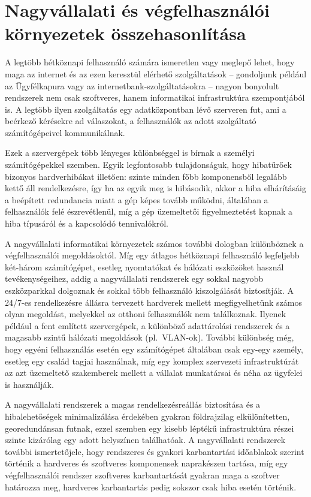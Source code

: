 \section{Nagyvállalati és végfelhasználói környezetek összehasonlítása}
A legtöbb hétköznapi felhasználó számára ismeretlen vagy meglepő lehet, hogy maga az internet és az ezen keresztül elérhető szolgáltatások -- gondoljunk például az Ügyfélkapura vagy az internetbank-szolgáltatásokra -- nagyon bonyolult rendszerek nem csak szoftveres, hanem informatikai infrastruktúra szempontjából is. A legtöbb ilyen szolgáltatás egy adatközpontban lévő szerveren fut, ami a beérkező kérésekre ad válaszokat, a felhasználók az adott szolgáltató számítógépeivel kommunikálnak.

Ezek a szervergépek több lényeges különbséggel is bírnak a személyi számítógépekkel szemben. Egyik legfontosabb tulajdonságuk, hogy hibatűrőek bizonyos hardverhibákat illetően: szinte minden főbb komponensből legalább kettő áll rendelkezésre, így ha az egyik meg is hibásodik, akkor a hiba elhárításáig a beépített redundancia miatt a gép képes tovább működni, általában a felhasználók felé észrevétlenül, míg a gép üzemeltetői figyelmeztetést kapnak a hiba típusáról és a kapcsolódó tennivalókról.

A nagyvállalati informatikai környezetek számos további dologban különböznek a végfelhasználói megoldásoktól. Míg egy átlagos hétköznapi felhasználó legfeljebb két-három számítógépet, esetleg nyomtatókat és hálózati eszközöket használ tevékenységeihez, addig a nagyvállalati rendszerek egy sokkal nagyobb eszközparkkal dolgoznak és sokkal több felhasználó kiszolgálását biztosítják. A 24/7-es rendelkezésre állásra tervezett hardverek mellett megfigyelhetünk számos olyan megoldást, melyekkel az otthoni felhasználók nem találkoznak. Ilyenek például a fent említett szervergépek, a különböző adattárolási rendszerek és a magasabb szintű hálózati megoldások (pl.~VLAN-ok). További különbség még, hogy egyéni felhasználás esetén egy számítógépet általában csak egy-egy személy, esetleg egy család tagjai használnak, míg egy komplex szervezeti infrastruktúrát az azt üzemeltető szakemberek mellett a vállalat munkatársai és néha az ügyfelei is használják.

A nagyvállalati rendszerek a magas rendelkezésreállás biztosítása és a hibalehetőségek minimalizálása érdekében gyakran földrajzilag elkülönítetten, georedundánsan futnak, ezzel szemben egy kisebb léptékű infrastruktúra részei szinte kizárólag egy adott helyszínen találhatóak. A nagyvállalati rendszerek további ismertetőjele, hogy rendszeres és gyakori karbantartási időablakok szerint történik a hardveres és szoftveres komponensek naprakészen tartása, míg egy végfelhasználói rendszer szoftveres karbantartását gyakran maga a szoftver határozza meg, hardveres karbantartás pedig sokszor csak hiba esetén történik.

